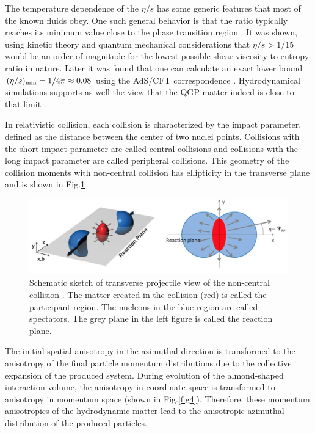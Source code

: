 The temperature dependence of the $\eta/s$ has some generic features that most of the known fluids obey. One such general behavior is that the ratio typically reaches its minimum value close to the phase transition region \cite{Lacey:2006bc}. 
It was shown, using kinetic theory and quantum mechanical considerations \cite{PhysRevD.31.53} that $\eta/s>1/15$ would be an order of magnitude for the lowest possible shear viscosity to entropy ratio in nature. Later it was found that one can calculate an exact lower bound $(\eta/s)_{\rm min}=1/4\pi\approx0.08$ using the AdS/CFT correspondence \cite{Kovtun:2004de}. Hydrodynamical simulations supports as well the view that the QGP matter indeed is close to that limit \cite{Gale:2012rq}. 	
	
	 In relativistic collision, each collision is characterized by the impact parameter, defined as the distance between the center of two nuclei points. Collisions with the short impact parameter are called central collisions and collisions with the long impact parameter are called peripheral collisions.  This geometry of the collision moments with non-central collision has ellipticity in the transverse plane and is shown in Fig.\ref{fig3}
	
\begin{figure}[t]
\centerline{\includegraphics[width=13.0cm]{figures/flow_clasic}}
\caption{Schematic sketch of transverse projectile view of the non-central collision \cite{Snellings:2011sz}. The matter created in the collision (red) is called the participant region. The nucleons in the blue region are called spectators. The grey plane in the left figure is called the reaction plane.}
\label{fig3}
\end{figure}

	The initial spatial anisotropy in the azimuthal direction is transformed to the anisotropy of the final particle momentum distributions due to the collective expansion of the produced system. During evolution of the almond-shaped interaction volume, the anisotropy in coordinate space is transformed to anisotropy in momentum space (shown in Fig.\ref{fig4}). Therefore, these momentum anisotropies of the hydrodynamic matter lead to the anisotropic azimuthal distribution of the produced particles. 
	
